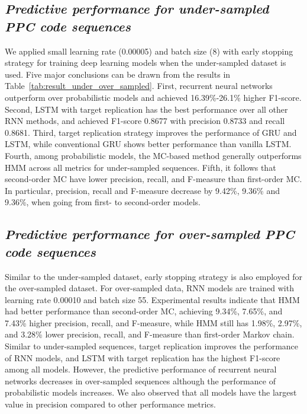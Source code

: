 \documentclass{amia_summit_2018}
\begin{document}
\subsection*{\textit{Predictive performance for under-sampled PPC code sequences}}
We applied small learning rate (0.00005) and batch size (8) with early stopping strategy for training deep learning models when the under-sampled dataset is used. Five major conclusions can be drawn from the results in Table~\ref{tab:result_under_over_sampled}. First, recurrent neural networks outperform over probabilistic models and achieved 16.39\%-26.1\% higher F1-score. Second, LSTM with target replication has the best performance over all other RNN methods, and achieved F1-score 0.8677 with precision 0.8733 and recall 0.8681. Third, target replication strategy improves the performance of GRU and LSTM, while conventional GRU shows better performance than vanilla LSTM. Fourth, among probabilistic models, the MC-based method generally outperforms HMM across all metrics for under-sampled sequences. Fifth, it follows that second-order MC have lower precision, recall, and F-measure than first-order MC. In particular, precision, recall and F-measure decrease by 9.42\%, 9.36\% and 9.36\%, when going from first- to second-order models.

\subsection*{\textit{Predictive performance for over-sampled PPC code sequences}}
Similar to the under-sampled dataset, early stopping strategy is also employed for the over-sampled dataset. For over-sampled data, RNN models are trained with learning rate 0.00010 and batch size 55. Experimental results indicate that HMM had better performance than second-order MC, achieving 9.34\%, 7.65\%, and 7.43\% higher precision, recall, and F-measure, while HMM still has 1.98\%, 2.97\%, and 3.28\% lower precision, recall, and F-measure than first-order Markov chain. Similar to under-sampled sequences, target replication improves the performance of RNN models, and LSTM with target replication has the highest F1-score among all models. However, the predictive performance of recurrent neural networks decreases in over-sampled sequences although the performance of probabilistic models increases. We also observed that all models have the largest value in precision compared to other performance metrics.
\end{document}
